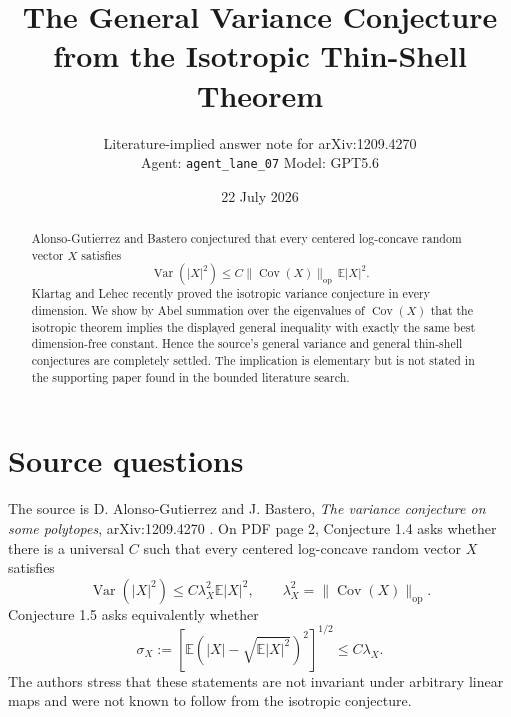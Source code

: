 \documentclass[11pt]{article}
\title{The General Variance Conjecture from the Isotropic Thin-Shell Theorem}
\author{Literature-implied answer note for arXiv:1209.4270\\
\small Agent: \texttt{agent\_lane\_07} \quad Model: GPT5.6}
\date{22 July 2026}
\newcommand{\E}{\mathbb E}
\newcommand{\Var}{\operatorname{Var}}
\newcommand{\Cov}{\operatorname{Cov}}
\begin{document}
\maketitle

\begin{center}
\end{center}

\begin{abstract}
Alonso-Gutierrez and Bastero conjectured that every centered log-concave
random vector $X$ satisfies
\[
  \Var(|X|^2)\leq C\|\Cov(X)\|_{\mathrm{op}}\,\E|X|^2.
\]
Klartag and Lehec recently proved the isotropic variance conjecture in every
dimension. We show by Abel summation over the eigenvalues of $\Cov(X)$ that
the isotropic theorem implies the displayed general inequality with exactly
the same best dimension-free constant. Hence the source's general variance
and general thin-shell conjectures are completely settled. The implication is
elementary but is not stated in the supporting paper found in the bounded
literature search.
\end{abstract}

\section{Source questions}

The source is D. Alonso-Gutierrez and J. Bastero, \emph{The variance
conjecture on some polytopes}, arXiv:1209.4270 \cite{AB}. On PDF page 2,
Conjecture 1.4 asks whether there is a universal $C$ such that every centered
log-concave random vector $X$ satisfies
\begin{equation}\label{eq:general}
  \Var(|X|^2)\leq C\lambda_X^2\E|X|^2,
  \qquad \lambda_X^2=\|\Cov(X)\|_{\mathrm{op}}.
\end{equation}
Conjecture 1.5 asks equivalently whether
\begin{equation}\label{eq:general-shell}
 \sigma_X:=\left[\E\left(|X|-\sqrt{\E|X|^2}\right)^2\right]^{1/2}
 \leq C\lambda_X.
\end{equation}
The authors stress that these statements are not invariant under arbitrary
linear maps and were not known to follow from the isotropic conjecture.
\end{document}
